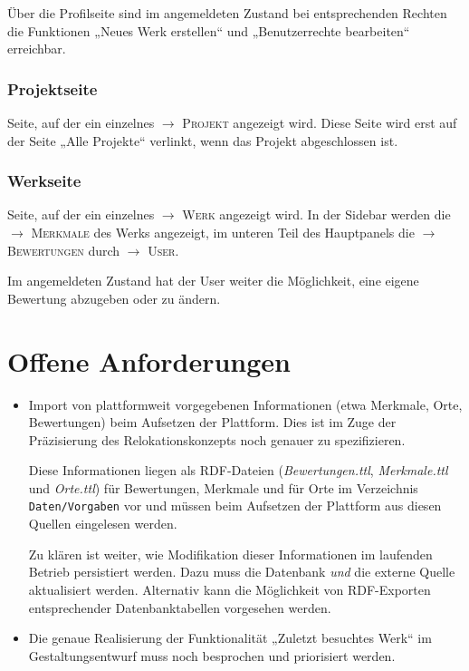 \documentclass[a4paper,11pt]{article}
\newcommand{\glossar}[1]{{$\to$ \textsc{#1}}}
\begin{document}
Über die Profilseite sind im angemeldeten Zustand bei entsprechenden Rechten
die Funktionen „Neues Werk erstellen“ und „Benutzerrechte bearbeiten“
erreichbar.

\subsubsection{Projektseite}
Seite, auf der ein einzelnes \glossar{Projekt} angezeigt wird.  Diese Seite
wird erst auf der Seite „Alle Projekte“ verlinkt, wenn das Projekt
abgeschlossen ist. 

\subsubsection{Werkseite}
Seite, auf der ein einzelnes \glossar{Werk} angezeigt wird.  In der Sidebar
werden die \glossar{Merkmale} des Werks angezeigt, im unteren Teil des
Hauptpanels die \glossar{Bewertungen} durch \glossar{User}.  

Im angemeldeten Zustand hat der User weiter die Möglichkeit, eine eigene
Bewertung abzugeben oder zu ändern.
  
\section{Offene Anforderungen} 

\begin{itemize}
\item Import von plattformweit vorgegebenen Informationen (etwa Merkmale, Orte,
  Bewertungen) beim Aufsetzen der Plattform. Dies ist im Zuge der Präzisierung
  des Relokationskonzepts noch genauer zu spezifizieren.

  Diese Informationen liegen als RDF-Dateien (\emph{Bewertungen.ttl},
  \emph{Merkmale.ttl} und \emph{Orte.ttl}\/) für Bewertungen, Merkmale und für
  Orte im Verzeichnis \texttt{Daten/Vorgaben} vor und müssen beim Aufsetzen
  der Plattform aus diesen Quellen eingelesen werden.

  Zu klären ist weiter, wie Modifikation dieser Informationen im laufenden
  Betrieb persistiert werden. Dazu muss die Datenbank \emph{und} die externe
  Quelle aktualisiert werden. Alternativ kann die Möglichkeit von RDF-Exporten
  entsprechender Datenbanktabellen vorgesehen werden.

\item Die genaue Realisierung der Funktionalität „Zuletzt besuchtes Werk“ im
  Gestaltungsentwurf muss noch besprochen und priorisiert werden.
\end{itemize}
\end{document}
